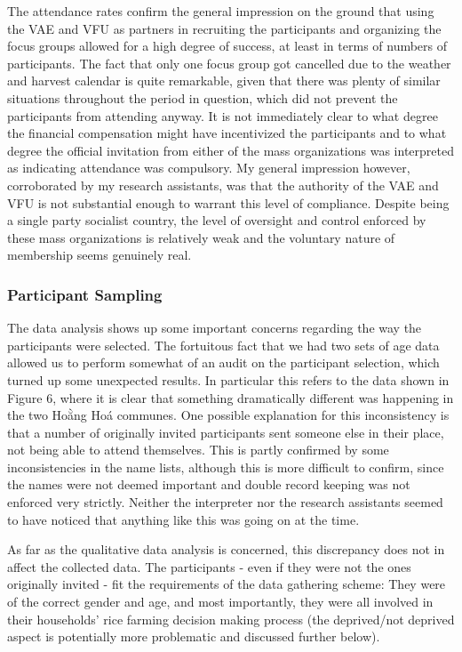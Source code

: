 \documentclass[]{article}
\begin{document}
The attendance rates confirm the general impression on the ground that
using the VAE and VFU as partners in recruiting the participants and
organizing the focus groups allowed for a high degree of success, at
least in terms of numbers of participants. The fact that only one focus
group got cancelled due to the weather and harvest calendar is quite
remarkable, given that there was plenty of similar situations throughout
the period in question, which did not prevent the participants from
attending anyway. It is not immediately clear to what degree the
financial compensation might have incentivized the participants and to
what degree the official invitation from either of the mass
organizations was interpreted as indicating attendance was compulsory.
My general impression however, corroborated by my research assistants,
was that the authority of the VAE and VFU is not substantial enough to
warrant this level of compliance. Despite being a single party socialist
country, the level of oversight and control enforced by these mass
organizations is relatively weak and the voluntary nature of membership
seems genuinely real.

\hypertarget{participant-sampling}{%
\subsubsection{Participant Sampling}\label{participant-sampling}}

The data analysis shows up some important concerns regarding the way the
participants were selected. The fortuitous fact that we had two sets of
age data allowed us to perform somewhat of an audit on the participant
selection, which turned up some unexpected results. In particular this
refers to the data shown in Figure 6, where it is clear that something
dramatically different was happening in the two Hoằng Hoá communes. One
possible explanation for this inconsistency is that a number of
originally invited participants sent someone else in their place, not
being able to attend themselves. This is partly confirmed by some
inconsistencies in the name lists, although this is more difficult to
confirm, since the names were not deemed important and double record
keeping was not enforced very strictly. Neither the interpreter nor the
research assistants seemed to have noticed that anything like this was
going on at the time.

As far as the qualitative data analysis is concerned, this discrepancy
does not in affect the collected data. The participants - even if they
were not the ones originally invited - fit the requirements of the data
gathering scheme: They were of the correct gender and age, and most
importantly, they were all involved in their households' rice farming
decision making process (the deprived/not deprived aspect is potentially
more problematic and discussed further below).
\end{document}
